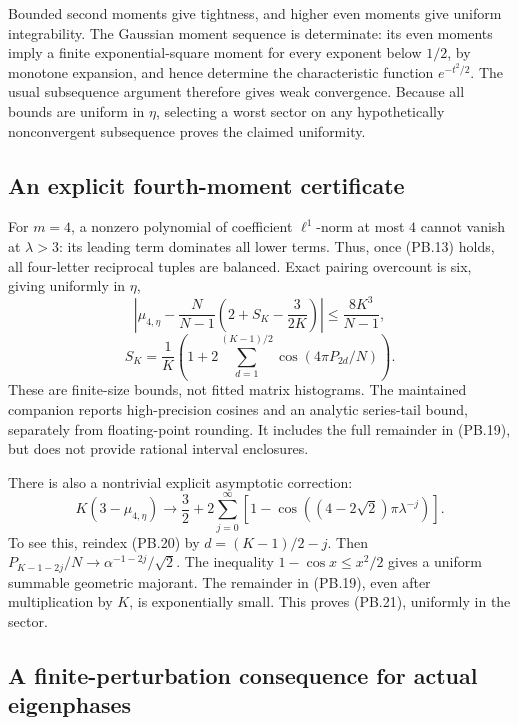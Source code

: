 Bounded second moments give tightness, and higher even moments give uniform integrability. The Gaussian moment sequence is determinate: its even moments imply a finite exponential-square moment for every exponent below \(1/2\), by monotone expansion, and hence determine the characteristic function \(e^{-t^2/2}\). The usual subsequence argument therefore gives weak convergence. Because all bounds are uniform in \(\eta\), selecting a worst sector on any hypothetically nonconvergent subsequence proves the claimed uniformity.

\subsection{An explicit fourth-moment certificate}\label{pell_blocks:an-explicit-fourth-moment-certificate}

For \(m=4\), a nonzero polynomial of coefficient \(\ell^1\)-norm at most \(4\) cannot vanish at \(\lambda>3\): its leading term dominates all lower terms. Thus, once (PB.13) holds, all four-letter reciprocal tuples are balanced. Exact pairing overcount is six, giving uniformly in \(\eta\), \[
 \left|\mu_{4,\eta}-\frac{N}{N-1}
 \left(2+S_K-\frac{3}{2K}\right)\right|
 \leq\frac{8K^3}{N-1}, \tag{PB.19}
\] \[
 S_K=\frac1K\left(1+2\sum_{d=1}^{(K-1)/2}
                    \cos(4\pi P_{2d}/N)\right). \tag{PB.20}
\] These are finite-size bounds, not fitted matrix histograms. The maintained companion reports high-precision cosines and an analytic series-tail bound, separately from floating-point rounding. It includes the full remainder in (PB.19), but does not provide rational interval enclosures.

There is also a nontrivial explicit asymptotic correction: \[
 K(3-\mu_{4,\eta})\longrightarrow
 \frac32+2\sum_{j=0}^\infty
 \left[1-\cos\left((4-2\sqrt2)\pi\lambda^{-j}\right)\right]. \tag{PB.21}
\] To see this, reindex (PB.20) by \(d=(K-1)/2-j\). Then \(P_{K-1-2j}/N\to\alpha^{-1-2j}/\sqrt2\). The inequality \(1-\cos x\leq x^2/2\) gives a uniform summable geometric majorant. The remainder in (PB.19), even after multiplication by \(K\), is exponentially small. This proves (PB.21), uniformly in the sector.

\subsection{A finite-perturbation consequence for actual eigenphases}\label{pell_blocks:a-finite-perturbation-consequence-for-actual-eigenphases}

